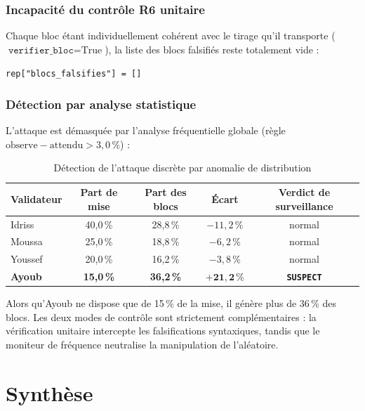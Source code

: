\documentclass[11pt,a4paper]{article}
\begin{document}
\subsubsection*{Incapacité du contrôle R6 unitaire}
Chaque bloc étant individuellement cohérent avec le tirage qu'il transporte ($\texttt{verifier\_bloc} = \text{True}$), la liste des blocs falsifiés reste totalement vide :
\begin{center}
\texttt{rep["blocs\_falsifies"] = []}
\end{center}

\subsubsection*{Détection par analyse statistique}
L'attaque est démasquée par l'analyse fréquentielle globale (règle $\text{observe} - \text{attendu} > 3{,}0\,\%$) :

\begin{table}[H]
\centering
\begin{tabular}{@{}lcccc@{}}
\toprule
\textbf{Validateur} & \textbf{Part de mise} & \textbf{Part des blocs} & \textbf{Écart} & \textbf{Verdict de surveillance} \\
\midrule
Idriss  & 40,0\,\% & 28,8\,\% & $-11{,}2\,\%$ & normal \\
Moussa  & 25,0\,\% & 18,8\,\% & $-6{,}2\,\%$  & normal \\
Youssef & 20,0\,\% & 16,2\,\% & $-3{,}8\,\%$  & normal \\
\textbf{Ayoub} & \textbf{15,0\,\%} & \textbf{36,2\,\%} & $\mathbf{+21{,}2\,\%}$ & \textbf{\texttt{SUSPECT}} \\
\bottomrule
\end{tabular}
\caption{Détection de l'attaque discrète par anomalie de distribution}
\label{tab:frequences_suspect}
\end{table}

Alors qu'Ayoub ne dispose que de 15\,\% de la mise, il génère plus de 36\,\% des blocs. Les deux modes de contrôle sont strictement complémentaires : la vérification unitaire intercepte les falsifications syntaxiques, tandis que le moniteur de fréquence neutralise la manipulation de l'aléatoire.

\section{Synthèse}
\end{document}
